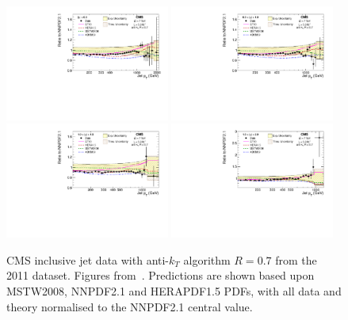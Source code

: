 \begin{figure}[ht]
\centering
\includegraphics[width=0.48\textwidth]{5-LHCdata/figs/Inclusive_Data_over_Theory_Ybin0.pdf}
\includegraphics[width=0.48\textwidth]{5-LHCdata/figs/Inclusive_Data_over_Theory_Ybin1.pdf}
\includegraphics[width=0.48\textwidth]{5-LHCdata/figs/Inclusive_Data_over_Theory_Ybin2.pdf}
\includegraphics[width=0.48\textwidth]{5-LHCdata/figs/Inclusive_Data_over_Theory_Ybin3.pdf}
\caption[CMS inclusive jet data with anti-$k_T$ algorithm $R=0.7$]{CMS inclusive jet data with anti-$k_T$ algorithm $R=0.7$ from the 2011 dataset. Figures from~\cite{Chatrchyan:2012bja}. Predictions are shown based upon MSTW2008, NNPDF2.1 and HERAPDF1.5 PDFs, with all data and theory normalised to the NNPDF2.1 central value.}
\label{fig:CMSR07Jets}
\end{figure}

